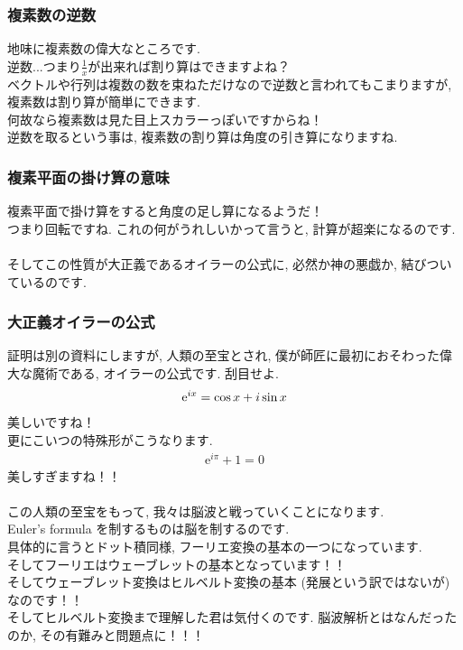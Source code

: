 \documentclass[11pt,a4paper]{jsarticle}
\begin{document}
\subsubsection{複素数の逆数}
地味に複素数の偉大なところです.\\
逆数...つまり$\frac{1}{x}$が出来れば割り算はできますよね？\\
ベクトルや行列は複数の数を束ねただけなので逆数と言われてもこまりますが, 複素数は割り算が簡単にできます. \\
何故なら複素数は見た目上スカラーっぽいですからね！\\
逆数を取るという事は, 複素数の割り算は角度の引き算になりますね.\\

\subsubsection{複素平面の掛け算の意味}
複素平面で掛け算をすると角度の足し算になるようだ！\\
つまり回転ですね. これの何がうれしいかって言うと, 計算が超楽になるのです.\\
\\

そしてこの性質が大正義であるオイラーの公式に, 必然か神の悪戯か, 結びついているのです.
\subsubsection{大正義オイラーの公式}
証明は別の資料にしますが, 人類の至宝とされ, 僕が師匠に最初におそわった偉大な魔術である, オイラーの公式です. 刮目せよ.\\
\begin{eqnarray}
\mathrm{e}^{ix} = \cos x + \mathstrut i\sin x
\label{eq:euler}
\end{eqnarray}
美しいですね！\\
更にこいつの特殊形がこうなります.\\
\begin{eqnarray}
\mathrm{e}^{i\pi} + 1 = 0
\end{eqnarray}
美しすぎますね！！\\
\\
この人類の至宝をもって, 我々は脳波と戦っていくことになります.\\
Euler's formula を制するものは脳を制するのです.\\
具体的に言うとドット積同様, フーリエ変換の基本の一つになっています. \\
そしてフーリエはウェーブレットの基本となっています！！\\
そしてウェーブレット変換はヒルベルト変換の基本 (発展という訳ではないが) なのです！！\\
そしてヒルベルト変換まで理解した君は気付くのです. 脳波解析とはなんだったのか, その有難みと問題点に！！！\\
\end{document}
